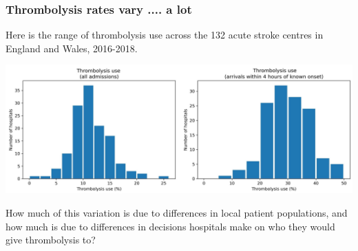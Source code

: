 \begin{frame}
\frametitle{Thrombolysis rates vary .... a lot}
Here is the range of thrombolysis use across the 132 acute stroke centres in England and Wales, 2016-2018.
\begin{center}
\includegraphics[width=1.0\textwidth]{./images/thrombolysis_hist}
\end{center}

How much of this variation is due to differences in local patient populations, and how much is due to differences in decisions hospitals make on who they would give thrombolysis to?
\end{frame}
